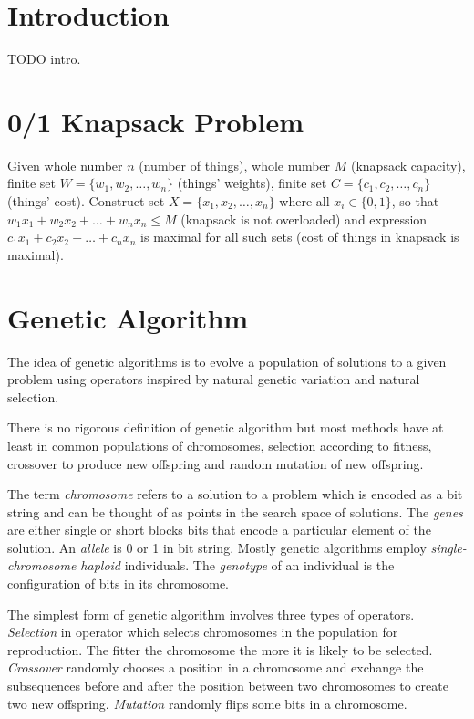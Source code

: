 \documentclass{article}
\begin{document}
\section{Introduction}

TODO intro.

\section{0/1 Knapsack Problem}

Given whole number $n$ (number of things),
whole number $M$ (knapsack capacity),
finite set $W = \{w_1, w_2, \dots , w_n\}$ (things' weights),
finite set $C = \{c_1, c_2, \dots , c_n\}$ (things' cost).
Construct set $X = \{x_1, x_2, \dots , x_n\}$ where all $x_i \in \{0, 1\}$,
so that $w_1 x_1 + w_2 x_2 + \dots + w_n x_n \leq M$
(knapsack is not overloaded)
and expression $c_1 x_1 + c_2 x_2 + \dots + c_n x_n$ is maximal for all such
sets (cost of things in knapsack is maximal).

\section{Genetic Algorithm}

The idea of genetic algorithms is to evolve a population of solutions
to a given problem using operators inspired by natural genetic variation
and natural selection.
\cite{mitchell1996}

There is no rigorous definition of genetic algorithm but most methods
have at least in common populations of chromosomes,
selection according to fitness, crossover to produce new offspring
and random mutation of new offspring.
\cite{mitchell1996}

The term \textit{chromosome} refers to a solution to a problem
which is encoded as a bit string
and can be thought of as points in the search space of solutions.
The \textit{genes} are either single or short blocks bits
that encode a particular element of the solution.
An \textit{allele} is 0 or 1 in bit string.
Mostly genetic algorithms employ \textit{single-chromosome haploid} individuals.
The \textit{genotype} of an individual is the configuration of bits
in its chromosome.
\cite{mitchell1996}

The simplest form of genetic algorithm involves three types of operators.
\textit{Selection} in operator which selects chromosomes in the population for
reproduction.
The fitter the chromosome the more it is likely to be selected.
\textit{Crossover} randomly chooses a position in a chromosome
and exchange the subsequences before and after the position between
two chromosomes to create two new offspring.
\textit{Mutation} randomly flips some bits in a chromosome.
\cite{mitchell1996}
\end{document}
